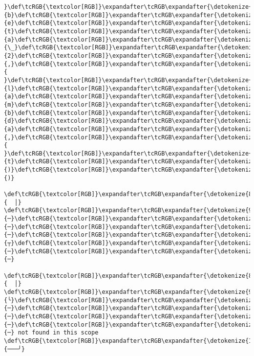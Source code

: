 \documentclass[11pt]{article}
\begin{document}
\begin{Verbatim}[commandchars=\\\{\}, frame=single, framerule=2mm, rulecolor=\color{outerrorbackground}]
}\def\tcRGB{\textcolor[RGB]}\expandafter\tcRGB\expandafter{\detokenize{178,178,178}}{b}\def\tcRGB{\textcolor[RGB]}\expandafter\tcRGB\expandafter{\detokenize{178,178,178}}{e}\def\tcRGB{\textcolor[RGB]}\expandafter\tcRGB\expandafter{\detokenize{178,178,178}}{t}\def\tcRGB{\textcolor[RGB]}\expandafter\tcRGB\expandafter{\detokenize{178,178,178}}{a}\def\tcRGB{\textcolor[RGB]}\expandafter\tcRGB\expandafter{\detokenize{178,178,178}}{\_}\def\tcRGB{\textcolor[RGB]}\expandafter\tcRGB\expandafter{\detokenize{178,178,178}}{2}\def\tcRGB{\textcolor[RGB]}\expandafter\tcRGB\expandafter{\detokenize{178,178,178}}{,}\def\tcRGB{\textcolor[RGB]}\expandafter\tcRGB\expandafter{\detokenize{178,178,178}}{ }\def\tcRGB{\textcolor[RGB]}\expandafter\tcRGB\expandafter{\detokenize{178,178,178}}{l}\def\tcRGB{\textcolor[RGB]}\expandafter\tcRGB\expandafter{\detokenize{178,178,178}}{a}\def\tcRGB{\textcolor[RGB]}\expandafter\tcRGB\expandafter{\detokenize{178,178,178}}{m}\def\tcRGB{\textcolor[RGB]}\expandafter\tcRGB\expandafter{\detokenize{178,178,178}}{b}\def\tcRGB{\textcolor[RGB]}\expandafter\tcRGB\expandafter{\detokenize{178,178,178}}{d}\def\tcRGB{\textcolor[RGB]}\expandafter\tcRGB\expandafter{\detokenize{178,178,178}}{a}\def\tcRGB{\textcolor[RGB]}\expandafter\tcRGB\expandafter{\detokenize{178,178,178}}{,}\def\tcRGB{\textcolor[RGB]}\expandafter\tcRGB\expandafter{\detokenize{178,178,178}}{ }\def\tcRGB{\textcolor[RGB]}\expandafter\tcRGB\expandafter{\detokenize{178,178,178}}{t}\def\tcRGB{\textcolor[RGB]}\expandafter\tcRGB\expandafter{\detokenize{178,178,178}}{)}\def\tcRGB{\textcolor[RGB]}\expandafter\tcRGB\expandafter{\detokenize{178,178,178}}{)}
 \def\tcRGB{\textcolor[RGB]}\expandafter\tcRGB\expandafter{\detokenize{88,88,88}}{  │}                         \def\tcRGB{\textcolor[RGB]}\expandafter\tcRGB\expandafter{\detokenize{95,0,135}}{─}\def\tcRGB{\textcolor[RGB]}\expandafter\tcRGB\expandafter{\detokenize{95,0,135}}{─}\def\tcRGB{\textcolor[RGB]}\expandafter\tcRGB\expandafter{\detokenize{95,0,135}}{─}\def\tcRGB{\textcolor[RGB]}\expandafter\tcRGB\expandafter{\detokenize{95,0,135}}{┬}\def\tcRGB{\textcolor[RGB]}\expandafter\tcRGB\expandafter{\detokenize{95,0,135}}{─}\def\tcRGB{\textcolor[RGB]}\expandafter\tcRGB\expandafter{\detokenize{95,0,135}}{─}  
 \def\tcRGB{\textcolor[RGB]}\expandafter\tcRGB\expandafter{\detokenize{88,88,88}}{  │}                            \def\tcRGB{\textcolor[RGB]}\expandafter\tcRGB\expandafter{\detokenize{95,0,135}}{╰}\def\tcRGB{\textcolor[RGB]}\expandafter\tcRGB\expandafter{\detokenize{95,0,135}}{─}\def\tcRGB{\textcolor[RGB]}\expandafter\tcRGB\expandafter{\detokenize{95,0,135}}{─}\def\tcRGB{\textcolor[RGB]}\expandafter\tcRGB\expandafter{\detokenize{95,0,135}}{─}\def\tcRGB{\textcolor[RGB]}\expandafter\tcRGB\expandafter{\detokenize{95,0,135}}{─} not found in this scope
\def\tcRGB{\textcolor[RGB]}\expandafter\tcRGB\expandafter{\detokenize{148,148,148}}{───╯}
    \end{Verbatim}
\end{document}
